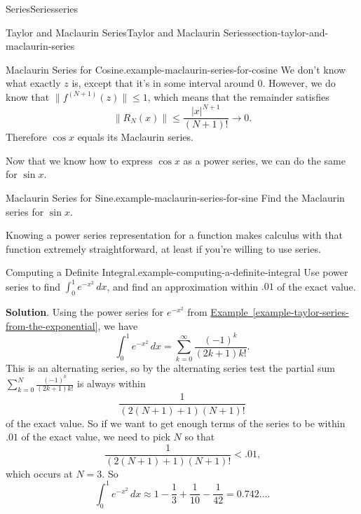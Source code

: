 \documentclass[oneside,10pt,]{book}
\numberwithin{equation}{section}
\newcommand{\lt}{<}
\begin{document}
\begin{chapterptx}{Series}{}{Series}{}{}{series}
\begin{sectionptx}{Taylor and Maclaurin Series}{}{Taylor and Maclaurin Series}{}{}{section-taylor-and-maclaurin-series}
\begin{example}{Maclaurin Series for Cosine.}{example-maclaurin-series-for-cosine}
We don't know what exactly \(z\) is, except that it's in some interval around \(0\). However, we do know that \(\|f^{(N+1)}(z)\|\leq 1\), which means that the remainder satisfies%
\begin{equation*}
\|R_{N}(x)\| \leq \frac{|x|^{N+1}}{(N+1)!}\to0\text{.}
\end{equation*}
Therefore \(\cos x\) equals its Maclaurin series.%
\end{example}
\hypertarget{p-975}{}%
Now that we know how to express \(\cos x\) as a power series, we can do the same for \(\sin x\).%
\begin{example}{Maclaurin Series for Sine.}{example-maclaurin-series-for-sine}%
\hypertarget{p-976}{}%
Find the Maclaurin series for \(\sin x\).%
\end{example}
\hypertarget{p-977}{}%
Knowing a power series representation for a function makes calculus with that function extremely straightforward, at least if you're willing to use series.%
\begin{example}{Computing a Definite Integral.}{example-computing-a-definite-integral}%
\hypertarget{p-978}{}%
Use power series to find \(\displaystyle\int_{0}^{1}e^{-x^{2}}\,dx\), and find an approximation within \(.01\) of the exact value.%
\par\smallskip%
\noindent\textbf{Solution}.\hypertarget{solution-198}{}\quad%
\hypertarget{p-979}{}%
Using the power series for \(e^{-x^{2}}\) from \hyperref[example-taylor-series-from-the-exponential]{Example~\ref{example-taylor-series-from-the-exponential}}, we have%
\begin{equation*}
\int_{0}^{1}e^{-x^{2}}\,dx = \sum_{k=0}^{\infty}\frac{(-1)^{k}}{(2k+1)k!}\text{.}
\end{equation*}
This is an alternating series, so by the alternating series test the partial sum \(\displaystyle\sum_{k=0}^{N}\frac{(-1)^{k}}{(2k+1)k!}\) is always within%
\begin{equation*}
\frac{1}{(2(N+1)+1)(N+1)!}
\end{equation*}
of the exact value. So if we want to get enough terms of the series to be within \(.01\) of the exact value, we need to pick \(N\) so that%
\begin{equation*}
\frac{1}{(2(N+1)+1)(N+1)!} \lt .01\text{,}
\end{equation*}
which occurs at \(N = 3\). So%
\begin{equation*}
\int_{0}^{1}e^{-x^{2}}\,dx \approx 1 - \frac{1}{3} + \frac{1}{10} - \frac{1}{42} = 0.742...\text{.}
\end{equation*}

\end{example}
\end{sectionptx}
\end{chapterptx}
\end{document}
